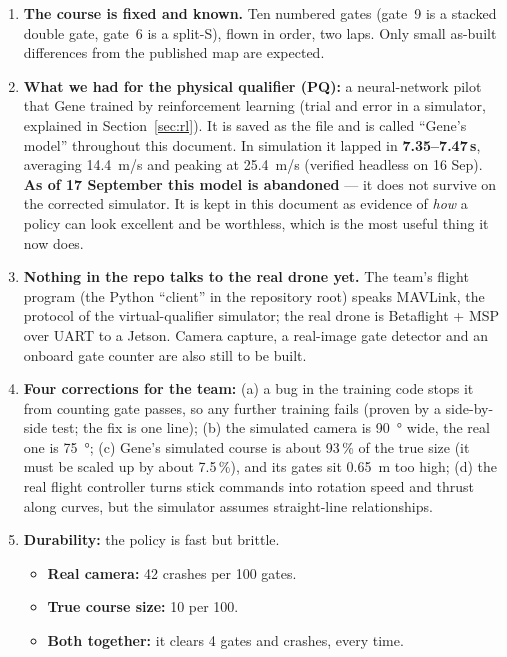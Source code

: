 \documentclass[10pt,a4paper]{article}
\newcommand{\code}[1]{\texttt{\detokenize{#1}}}
\begin{document}
\begin{titlepage}
\vspace{0.6cm}
\begin{takeaway}[Summary]
\begin{enumerate}[leftmargin=1.2em]
\item \textbf{The course is fixed and known.} Ten numbered gates (gate~9 is a stacked double gate, gate~6 is a split-S), flown in order, two laps. Only small as-built differences from the published map are expected.
\item \textbf{What we had for the physical qualifier (PQ):} a neural-network pilot that Gene trained by reinforcement learning (trial and error in a simulator, explained in Section~\ref{sec:rl}). It is saved as the file \code{pq_speed_best.pt} and is called ``Gene's model'' throughout this document. In simulation it lapped in \textbf{7.35--7.47\,s}, averaging \SI{14.4}{m/s} and peaking at \SI{25.4}{m/s} (verified headless on 16 Sep). \textbf{As of 17 September this model is abandoned} --- it does not survive on the corrected simulator. It is kept in this document as evidence of \emph{how} a policy can look excellent and be worthless, which is the most useful thing it now does.
\item \textbf{Nothing in the repo talks to the real drone yet.} The team's flight program (the Python ``client'' in the repository root) speaks MAVLink, the protocol of the virtual-qualifier simulator; the real drone is Betaflight + MSP over UART to a Jetson. Camera capture, a real-image gate detector and an onboard gate counter are also still to be built.
\item \textbf{Four corrections for the team:}
  (a) a bug in the training code stops it from counting gate passes, so any further training fails (proven by a side-by-side test; the fix is one line);
  (b) the simulated camera is \SI{90}{\degree} wide, the real one is \SI{75}{\degree};
  (c) Gene's simulated course is about 93\,\% of the true size (it must be scaled up by about 7.5\,\%), and its gates sit \SI{0.65}{m} too high;
  (d) the real flight controller turns stick commands into rotation speed and thrust along curves, but the simulator assumes straight-line relationships.
\item \textbf{Durability:} the policy is fast but brittle.
\begin{itemize}
\item \textbf{Real camera:} 42 crashes per 100 gates.
\item \textbf{True course size:} 10 per 100.
\item \textbf{Both together:} it clears 4 gates and crashes, every time.

\end{itemize}
\end{enumerate}
\end{takeaway}
\end{titlepage}
\end{document}
